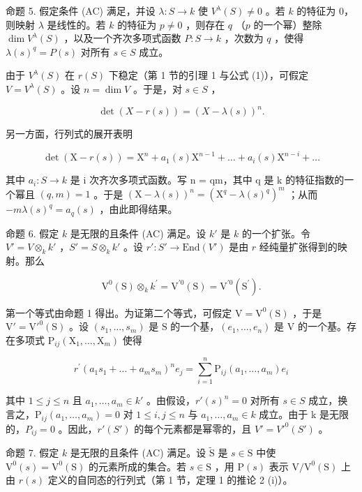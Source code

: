 命题 5. 假定条件 (AC) 满足，并设 \(\lambda : S \to k\) 使 \(V^{\lambda}(S) \neq 0\) 。若 \(k\) 的特征为 0，则映射 \(\lambda\) 是线性的。若 \(k\) 的特征为 \(p \neq 0\) ，则存在 \(q\) （\(p\) 的一个幂）整除 \(\dim V^{\lambda}(S)\) ，以及一个齐次多项式函数 \(P : S \to k\) ，次数为 \(q\) ，使得 \(\lambda(s)^{q} = P(s)\) 对所有 \(s \in S\) 成立。

由于 \(V^{\lambda}(S)\) 在 \(r(S)\) 下稳定（第 1 节的引理 1 与公式 (1)），可假定 \(V = V^{\lambda}(S)\) 。设 \(n = \dim V\) 。于是，对 \(s \in S\) ，

\[
\det (X - r (s)) = (X - \lambda (s)) ^ {n}.
\]

另一方面，行列式的展开表明

\[
\det (\mathrm{X} - r (s)) = \mathrm{X} ^ {n} + a _ {1} (s) \mathrm{X} ^ {n - 1} + \dots + a _ {i} (s) \mathrm{X} ^ {n - i} + \dots
\]

其中 \(a_{i}: S \to k\) 是 i 次齐次多项式函数。写 n = qm，其中 q 是 k 的特征指数的一个幂且 \((q, m) = 1\) 。于是 \((\mathrm{X} - \lambda(s))^{n} = (\mathrm{X}^{q} - \lambda(s)^{q})^{m}\) ；从而 \(-m\lambda(s)^{q} = a_{q}(s)\) ，由此即得结果。

命题 6. 假定 \(k\) 是无限的且条件 (AC) 满足。设 \(k'\) 是 \(k\) 的一个扩张。令 \(V' = V \otimes_k k'\) ，\(S' = S \otimes_k k'\) 。设 \(r': S' \to \text{End}(V')\) 是由 \(r\) 经纯量扩张得到的映射。那么

\[
\mathrm{V} ^ {0} (\mathrm{S}) \otimes_ {k} k ^ {\prime} = \mathrm{V} ^ {\prime 0} (\mathrm{S}) = \mathrm{V} ^ {\prime 0} (\mathrm{S} ^ {\prime}).
\]

第一个等式由命题 1 得出。为证第二个等式，可假定 \(\mathrm{V} = \mathrm{V}^0 (\mathrm{S})\) ，于是 \(\mathrm{V}' = \mathrm{V}'^{0}(\mathrm{S})\) 。设 \((s_1,\dots ,s_m)\) 是 \(\mathrm{S}\) 的一个基，\((e_1,\dots ,e_n)\) 是 \(\mathrm{V}\) 的一个基。存在多项式 \(\mathrm{P}_{ij}(\mathrm{X}_1,\dots ,\mathrm{X}_m)\) 使得

\[
r ^ {\prime} (a _ {1} s _ {1} + \dots + a _ {m} s _ {m}) ^ {n} e _ {j} = \sum_ {i = 1} ^ {n} \mathrm{P} _ {i j} (a _ {1}, \ldots , a _ {m}) e _ {i}
\]

其中 \(1 \leq j \leq n\) 且 \(a_{1}, \ldots, a_{m} \in k'\) 。由假设，\(r'(s)^{n} = 0\) 对所有 \(s \in S\) 成立，换言之，\(\mathrm{P}_{ij}(a_{1}, \ldots, a_{m}) = 0\) 对 \(1 \leq i, j \leq n\) 与 \(a_{1}, \ldots, a_{m} \in k\) 成立。由于 k 是无限的，\(P_{ij} = 0\) 。因此，\(r'(S')\) 的每个元素都是幂零的，且 \(V' = V'^{0}(S')\) 。

命题 7. 假定 \(k\) 是无限的且条件 (AC) 满足。设 \(\tilde{\mathrm{S}}\) 是 \(s \in \mathrm{S}\) 中使 \(\mathrm{V}^0(s) = \mathrm{V}^0(\mathrm{S})\) 的元素所成的集合。若 \(s \in \mathrm{S}\) ，用 \(\mathrm{P}(s)\) 表示 \(\mathrm{V} / \mathrm{V}^0(\mathrm{S})\) 上由 \(r(s)\) 定义的自同态的行列式（第 1 节，定理 1 的推论 2 (i)）。

